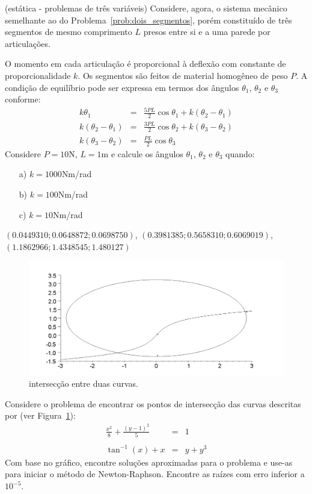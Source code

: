 \begin{exer}{(estática - problemas de três variáveis)} Considere, agora, o sistema mecânico semelhante ao do Problema~\ref{prob:dois_segmentos}, porém constituído de três segmentos de mesmo comprimento $L$ presos entre si e a uma parede por articulações.

O momento em cada articulação é proporcional à deflexão com constante de proporcionalidade $k$. Os segmentos são feitos de material homogêneo de peso $P$. A condição de equilíbrio pode ser expressa em termos dos ângulos $\theta_1$, $\theta_2$ e $\theta_3$ conforme:
\begin{eqnarray*}
k\theta_1&=& \frac{5PL}{2}\cos\theta_1 + k\left(\theta_2-\theta_1\right)\\
k\left(\theta_2-\theta_1\right)&=& \frac{3PL}{2}\cos\theta_2+k\left(\theta_3-\theta_2\right)\\
k\left(\theta_3-\theta_2\right)&=& \frac{PL}{2}\cos\theta_3
\end{eqnarray*}
Considere $P=10$N, $L=1$m e calcule os ângulos $\theta_1$, $\theta_2$ e $\theta_3$ quando:
\begin{itemize}
\item[a)] $k=1000$Nm/rad
\item[b)] $k=100$Nm/rad
\item[c)] $k=10$Nm/rad
\end{itemize}
\end{exer}
\begin{resp}
$\left(0.0449310; 0.0648872; 0.0698750  \right)$, $\left(0.3981385; 0.5658310; 0.6069019  \right)$, \\
$\left(1.1862966;1.4348545;1.480127  \right)$
\end{resp}


\begin{figure}
        \centering
	    \includegraphics[width=.5\textwidth]{cap_nlinsis/pics/inter_curvas}
		\caption{intersecção entre duas curvas.}
		\label{pic:inter_curvas}
	\end{figure}

\begin{exer}  Considere o problema de encontrar os pontos de intersecção das curvas descritas por (ver Figura~\ref{pic:inter_curvas}):
\begin{eqnarray*}
\frac{x^2}{8}+\frac{(y-1)^2}{5}&=&1\\~\\
\tan^{-1}(x)+x&=&y+y^3
\end{eqnarray*}
 Com base no gráfico, encontre soluções aproximadas para o problema e use-as para iniciar o método de Newton-Raphson. Encontre as raízes com erro inferior a $10^{-5}$.
\end{exer}

